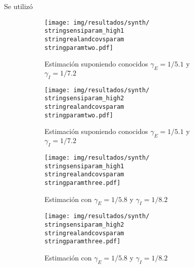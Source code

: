 Se utilizó 





\begin{figure}
\centering
\begin{subfigure}[b]{0.47\textwidth}
     \centering
     \texttt{[image: img/resultados/synth/\\stringsensiparam\_high1\\stringrealandcovsparam\\stringparamtwo.pdf]}
     \caption{Estimación suponiendo conocidos \(\gamma_E = 1/5.1\) y \(\gamma_I = 1/7.2\)}
     \label{fig:legend-sensi-b-class1-gamma_real}
\end{subfigure} 
\hfill
\begin{subfigure}[b]{0.47\textwidth}
     \centering
     \texttt{[image: img/resultados/synth/\\stringsensiparam\_high2\\stringrealandcovsparam\\stringparamtwo.pdf]}
     \caption{Estimación suponiendo conocidos \(\gamma_E = 1/5.1\) y \(\gamma_I = 1/7.2\)}
     \label{fig:legend-sensi-b-class2-gamma_real}
\end{subfigure} 
\hfill
\begin{subfigure}[b]{0.47\textwidth}
     \centering
     \texttt{[image: img/resultados/synth/\\stringsensiparam\_high1\\stringrealandcovsparam\\stringparamthree.pdf]}
     \caption{Estimación con \(\gamma_E = 1/5.8\) y \(\gamma_I = 1/8.2\)}
     \label{fig:legend-sensi-b-class1-gamma_estimado}
\end{subfigure} 
\hfill
\begin{subfigure}[b]{0.47\textwidth}
     \centering
     \texttt{[image: img/resultados/synth/\\stringsensiparam\_high2\\stringrealandcovsparam\\stringparamthree.pdf]}
     \caption{Estimación con \(\gamma_E = 1/5.8\) y \(\gamma_I = 1/8.2\)}
     \label{fig:legend-sensi-b-class2-gamma_estimado}
\end{subfigure} 
\hfill
\begin{subfigure}[b]{0.75\textwidth}
 \centering
{}
\end{subfigure}
\end{figure}
